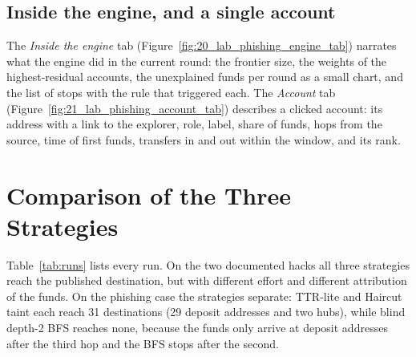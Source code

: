 \subsection{Inside the engine, and a single account}
The \emph{Inside the engine} tab (Figure~\ref{fig:20_lab_phishing_engine_tab}) narrates what the engine did in the current round: the frontier size, the weights of the highest-residual accounts, the unexplained funds per round as a small chart, and the list of stops with the rule that triggered each. The \emph{Account} tab (Figure~\ref{fig:21_lab_phishing_account_tab}) describes a clicked account: its address with a link to the explorer, role, label, share of funds, hops from the source, time of first funds, transfers in and out within the window, and its rank.



\section{Comparison of the Three Strategies}
Table~\ref{tab:runs} lists every run. On the two documented hacks all three strategies reach the published destination, but with different effort and different attribution of the funds. On the phishing case the strategies separate: TTR-lite and Haircut taint each reach 31 destinations (29 deposit addresses and two hubs), while blind depth-2 BFS reaches none, because the funds only arrive at deposit addresses after the third hop and the BFS stops after the second.


